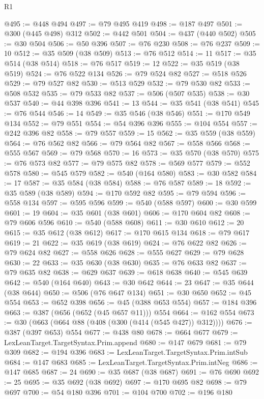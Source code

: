\begin{lexlean}{R1}
\begin{coremodule}
@495 := @448 @494
@497 := @79 @495 @419
@498 := @187 @497
@501 := @300 (@445 @498) @312
@502 := @442 @501
@504 := @437 (@440 @502)
@505 := @30 @504
@506 := @50 @396
@507 := @76 @230
@508 := @76 @237
@509 := 10
@512 := @35 @509 (@38 @509)
@513 := @76 @512
@514 := 11
@517 := @35 @514 (@38 @514)
@518 := @76 @517
@519 := 12
@522 := @35 @519 (@38 @519)
@524 := @76 @522 @134
@526 := @79 @524 @82
@527 := @518 @526
@529 := @79 @527 @82
@530 := @513 @529
@532 := @79 @530 @82
@533 := @508 @532
@535 := @79 @533 @82
@537 := @506 (@507 @535)
@538 := @30 @537
@540 := @44 @398 @396
@541 := 13
@544 := @35 @541 (@38 @541)
@545 := @76 @544
@546 := 14
@549 := @35 @546 (@38 @546)
@551 := @170 @549 @134
@552 := @79 @551
@554 := @54 @396 @396
@555 := @104 @554
@557 := @242 @396 @82
@558 := @79 @557
@559 := 15
@562 := @35 @559 (@38 @559)
@564 := @76 @562 @82
@566 := @79 @564 @82
@567 := @558 @566
@568 := @555 @567
@569 := @79 @568
@570 := 16
@573 := @35 @570 (@38 @570)
@575 := @76 @573 @82
@577 := @79 @575 @82
@578 := @569 @577
@579 := @552 @578
@580 := @545 @579
@582 := @540 (@164 @580)
@583 := @30 @582
@584 := 17
@587 := @35 @584 (@38 @584)
@588 := @76 @587
@589 := 18
@592 := @35 @589 (@38 @589)
@594 := @170 @592 @82
@595 := @79 @594
@596 := @558 @134
@597 := @595 @596
@599 := @540 (@588 @597)
@600 := @30 @599
@601 := 19
@604 := @35 @601 (@38 @601)
@606 := @170 @604 @82
@608 := @79 @606 @596
@610 := @540 (@588 @608)
@611 := @30 @610
@612 := 20
@615 := @35 @612 (@38 @612)
@617 := @170 @615 @134
@618 := @79 @617
@619 := 21
@622 := @35 @619 (@38 @619)
@624 := @76 @622 @82
@626 := @79 @624 @82
@627 := @558 @626
@628 := @555 @627
@629 := @79 @628
@630 := 22
@633 := @35 @630 (@38 @630)
@635 := @76 @633 @82
@637 := @79 @635 @82
@638 := @629 @637
@639 := @618 @638
@640 := @545 @639
@642 := @540 (@164 @640)
@643 := @30 @642
@644 := 23
@647 := @35 @644 (@38 @644)
@650 := @506 (@76 @647 @134)
@651 := @30 @650
@652 := @45 @554
@653 := @652 @398
@656 := @45 (@388 @653 @554)
@657 := @184 @396
@663 := @387 (@656 (@652 (@45 @657 @11))) @554
@664 := @162 @554
@673 := @30 (@663 (@664 @88 (@408 (@300 (@414 (@545 @427)) @312))))
@676 := @387 (@397 @653) @554
@677 := @438 @80
@678 := @664 @677
@679 := LexLeanTarget.TargetSyntax.Prim.append
@680 := @147 @679
@681 := @79 @309
@682 := @194 @396
@683 := LexLeanTarget.TargetSyntax.Prim.intSub
@684 := @147 @683
@685 := LexLeanTarget.TargetSyntax.Prim.intNeg
@686 := @147 @685
@687 := 24
@690 := @35 @687 (@38 @687)
@691 := @76 @690
@692 := 25
@695 := @35 @692 (@38 @692)
@697 := @170 @695 @82
@698 := @79 @697
@700 := @54 @180 @396
@701 := @104 @700
@702 := @196 @180

\end{coremodule}
\end{lexlean}
